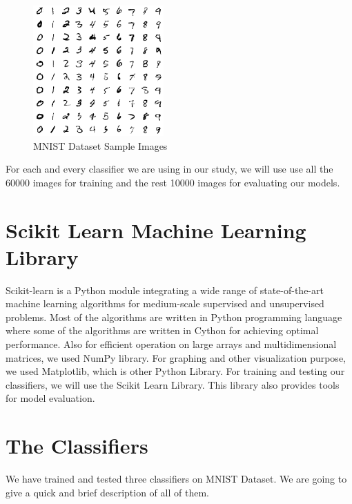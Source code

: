 \documentclass[12pt,a4paper]{article}
\begin{document}
\begin{figure}[!htb]
  \includegraphics[width=5cm,height=5cm,keepaspectratio]{mnist_example.png}
  \centering
  \caption{MNIST Dataset Sample Images}
  \label{fig:mnist_sample}
\end{figure}
For each and every classifier we are using in our study, we will use use all the 60000 images for training and the rest 10000 images for evaluating our models. 

\section{Scikit Learn Machine Learning Library}
Scikit-learn is a Python module integrating a wide range of state-of-the-art machine learning algorithms for medium-scale supervised and unsupervised problems\cite{pedregosa2011scikit}. Most of the algorithms are written in Python programming language where some of the algorithms are written in Cython for achieving optimal performance. Also for efficient operation on large arrays and multidimensional matrices, we used NumPy library.\cite{walt2011numpy} For graphing and other visualization purpose, we used Matplotlib, which is other Python Library. \cite{hackeling2014mastering} For training and testing our classifiers, we will use the Scikit Learn Library. This library also provides tools for model evaluation. 


\section{The Classifiers}
We have trained and tested three classifiers on MNIST Dataset. We are going to give a quick and brief description of all of them. 
\end{document}
